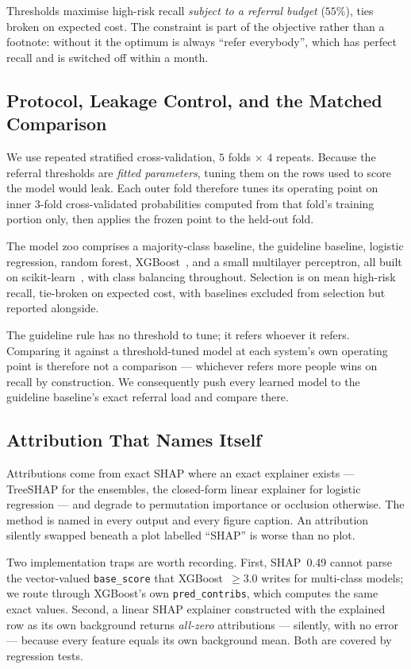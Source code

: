 \documentclass[journal]{IEEEtran}
\begin{document}
Thresholds maximise high-risk recall \emph{subject to a referral budget}
($55\%$), ties broken on expected cost. The constraint is part of the objective
rather than a footnote: without it the optimum is always ``refer everybody'',
which has perfect recall and is switched off within a month.

\subsection{Protocol, Leakage Control, and the Matched Comparison}
\label{sec:protocol}

We use repeated stratified cross-validation, $5$ folds $\times$ $4$ repeats.
Because the referral thresholds are \emph{fitted parameters}, tuning them on the
rows used to score the model would leak. Each outer fold therefore tunes its
operating point on inner $3$-fold cross-validated probabilities computed from
that fold's training portion only, then applies the frozen point to the held-out
fold.

The model zoo comprises a majority-class baseline, the guideline baseline,
logistic regression, random forest, XGBoost~\cite{chen2016xgboost}, and a small
multilayer perceptron, all built on scikit-learn~\cite{scikit-learn}, with class
balancing throughout. Selection is on mean high-risk recall, tie-broken on
expected cost, with baselines excluded from selection but reported alongside.

The guideline rule has no threshold to tune; it refers whoever it refers.
Comparing it against a threshold-tuned model at each system's own operating
point is therefore not a comparison --- whichever refers more people wins on
recall by construction. We consequently push every learned model to the
guideline baseline's exact referral load and compare there.

\subsection{Attribution That Names Itself}
\label{sec:attribution}

Attributions come from exact SHAP where an exact explainer exists --- TreeSHAP
for the ensembles, the closed-form linear explainer for logistic regression ---
and degrade to permutation importance or occlusion otherwise. The method is
named in every output and every figure caption. An attribution silently swapped
beneath a plot labelled ``SHAP'' is worse than no plot.

Two implementation traps are worth recording. First, SHAP~0.49 cannot parse the
vector-valued \texttt{base\_score} that XGBoost~$\geq 3.0$ writes for
multi-class models; we route through XGBoost's own \texttt{pred\_contribs},
which computes the same exact values. Second, a linear SHAP explainer
constructed with the explained row as its own background returns
\emph{all-zero} attributions --- silently, with no error --- because every
feature equals its own background mean. Both are covered by regression tests.
\end{document}
